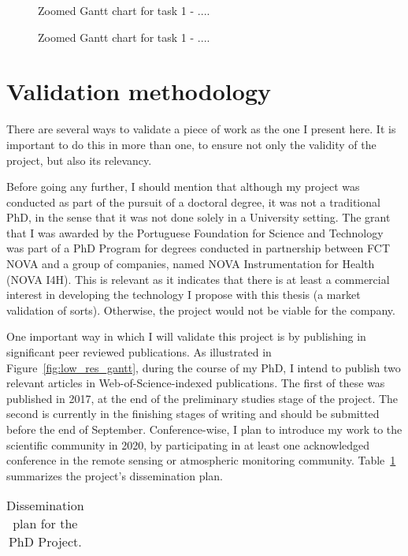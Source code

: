 \begin{figure}[htpb]
    \centering
    \missingfigure{}
    \caption{Zoomed Gantt chart for task 1 - ....}
    \label{fig:task3}
\end{figure}

\begin{figure}[htpb]
    \centering
    \missingfigure{}
    \caption{Zoomed Gantt chart for task 1 - ....}
    \label{fig:task4}
\end{figure}

\section{Validation methodology}%
\label{sec:validation_methodology}

There are several ways to validate a piece of work as the one I present
here. It is important to do this in more than one, to ensure not only
the validity of the project, but also its relevancy.

Before going any further, I should mention that although my project was
conducted as part of the pursuit of a doctoral degree, it was not a
traditional PhD, in the sense that it was not done solely in a
University setting. The grant that I was awarded by the Portuguese
Foundation for Science and Technology was part of a PhD Program for
degrees conducted in partnership between FCT NOVA and a group of
companies, named NOVA Instrumentation for Health (NOVA I4H). This is
relevant as it indicates that there is at least a commercial interest in
developing the technology I propose with this thesis (a market
validation of sorts). Otherwise, the project would not be viable for the
company.

One important way in which I will validate this project is by publishing
in significant peer reviewed publications. As illustrated in
Figure~\ref{fig:low_res_gantt}, during the course of my PhD, I intend to
publish two relevant articles in Web-of-Science-indexed publications.
The first of these was published in 2017, at the end of the preliminary
studies stage of the project. The second is currently in the finishing
stages of writing and should be submitted before the end of September.
Conference-wise, I plan to introduce my work to the scientific community
in 2020, by participating in at least one acknowledged conference in the
remote sensing or atmospheric monitoring community.
Table~\ref{tab:dissemination_plan} summarizes the project's
dissemination plan.

\begin{table}[htpb]
    \centering
    \caption{Dissemination plan for the PhD Project.}
    \label{tab:dissemination_plan}
    \begin{tabular}{c}
    
    \end{tabular}
\end{table}




